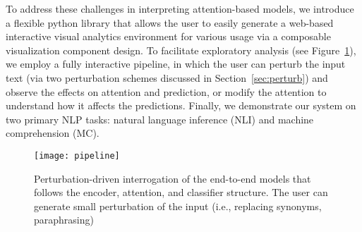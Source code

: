 To address these challenges in interpreting attention-based models, 
we introduce a flexible python library that allows the user to easily generate a web-based interactive visual analytics environment for various usage via a composable visualization component design.
%
To facilitate exploratory analysis (see Figure~\ref{fig:modelPipeline}), we employ a fully interactive pipeline, in which the user can perturb the input text (via two perturbation schemes discussed in Section~\ref{sec:perturb}) and observe the effects on attention and prediction, or modify the attention to understand how it affects the predictions.
%
Finally, we demonstrate our system on two primary NLP tasks: natural language
inference (NLI) and machine comprehension (MC). 

\begin{figure}[htbp]
\centering
\vspace{-2mm}
 \texttt{[image: pipeline]}
 \vspace{-3mm}
 \caption{
 Perturbation-driven interrogation of the end-to-end models that follows the encoder, attention, and classifier structure. The user can generate small perturbation of the input (i.e., replacing synonyms, paraphrasing)
 }
 \vspace{-3mm}
\label{fig:modelPipeline}
\end{figure}


